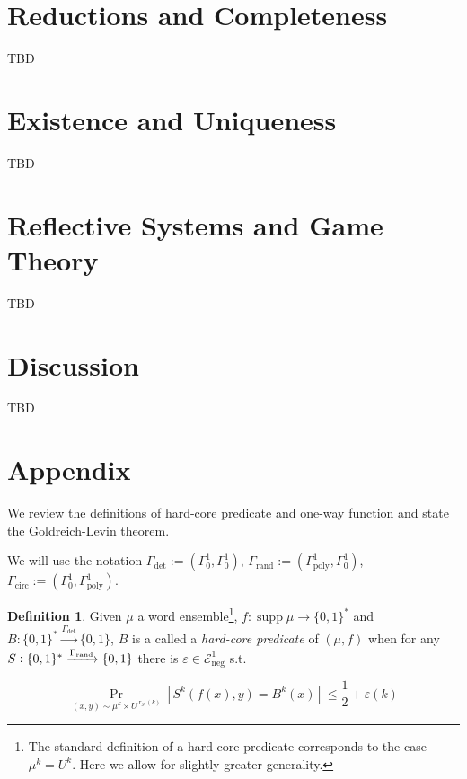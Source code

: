 \documentclass{article}
\theoremstyle{definition}
\newtheorem{definition}{Definition}[section]
\theoremstyle{plain}
\newcommand{\Words}{{\{ 0, 1 \}^*}}
\newcommand{\Bool}{\{0,1\}}
\DeclareMathOperator{\Supp}{supp}
\DeclareMathOperator{\Prb}{Pr}
\DeclareMathOperator{\R}{r}
\begin{document}
\section{Reductions and Completeness}
\label{sec:reductions}

TBD

\section{Existence and Uniqueness}
\label{sec:e_and_u}

TBD

\section{Reflective Systems and Game Theory}
\label{sec:reflective}

TBD

\section{Discussion}
\label{sec:discussion}

TBD

\appendix

\section{Appendix}

We review the definitions of hard-core predicate and one-way function and state the Goldreich-Levin theorem.

We will use the notation $\Gamma_{\text{det}}:=(\Gamma_0^1,\Gamma_0^1)$, $\Gamma_{\text{rand}}:=(\Gamma_{\text{poly}}^1,\Gamma_0^1)$, ${\Gamma_{\text{circ}}:=(\Gamma_0^1,\Gamma_{\text{poly}}^1)}$.

\begin{samepage}
\begin{definition}

Given $\mu$ a word ensemble\footnote{The standard definition of a hard-core predicate corresponds to the case $\mu^k=U^k$. Here we allow for slightly greater generality.}, $f: \Supp \mu \rightarrow \Words$ and ${B: \Words \xrightarrow{\Gamma_{\text{det}}} \Bool}$, $B$ is a called a \emph{hard-core predicate} of $(\mu,f)$ when for any $S: \Words \xrightarrow{\Gamma_{\textnormal{rand}}} \Bool$ there is $\varepsilon \in \mathcal{E}_{\text{neg}}^1$ s.t. 

\begin{equation}
\Prb_{(x,y) \sim \mu^k \times U^{\R_S(k)}}[S^k(f(x),y)=B^k(x)] \leq \frac{1}{2} + \varepsilon(k)
\end{equation}

\end{definition}
\end{samepage}
\end{document}

